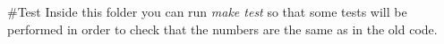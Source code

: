 \#\+Test Inside this folder you can run {\itshape make test} so that some tests will be performed in order to check that the numbers are the same as in the old code. 
